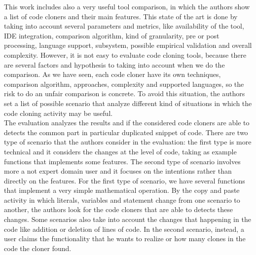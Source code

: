 This work includes also a very useful tool comparison, in which the authors show a list of code cloners and their main features. This state of the art is done by taking into account several parameters and metrics, like availability of the tool, IDE integration, comparison algorithm, kind of granularity, pre or post processing, language support, subsystem, possible empirical validation and overall complexity. However, it is not easy to evaluate code cloning tools, because there are several factors and hypothesis to taking into account when we do the comparison. As we have seen, each code cloner have its own techniques, comparison algorithm, approaches, complexity and supported languages, so the risk to do an unfair comparison is concrete. To avoid this situation, the authors set a list of possible scenario that analyze different kind of situations in which the code cloning activity may be useful. \\
The evaluation analyzes the results and if the considered code cloners are able to detects the common part in particular duplicated snippet of code. There are two type of scenario that the authors consider in the evaluation: the first type is more technical and it considers the changes at the level of code, taking as example functions that implements some features. The second type of scenario involves more a not expert domain user and it focuses on the intentions rather than directly on the features. For the first type of scenario, we have several functions that implement a very simple mathematical operation. By the copy and paste activity in which literals, variables and statement change from one scenario to another, the authors look for the code cloners that are able to detects these changes. Some scenarios also take into account the changes that happening in the code like addition or deletion of lines of code. In the second scenario, instead, a user claims the functionality that he wants to realize or how many clones in the code the cloner found. 
\newline
